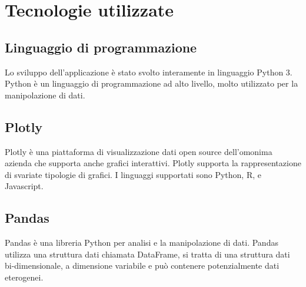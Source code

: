 
\section{Tecnologie utilizzate}

\subsection{Linguaggio di programmazione}
Lo sviluppo dell’applicazione è stato svolto interamente in linguaggio Python 3.
Python è un linguaggio di programmazione ad alto livello, molto utilizzato per la manipolazione di dati.

\subsection{Plotly}
Plotly è una piattaforma di visualizzazione dati open source dell’omonima azienda che supporta anche grafici interattivi.
Plotly supporta la rappresentazione di svariate tipologie di grafici.
I linguaggi supportati sono Python, R, e Javascript. 

\subsection{Pandas}
Pandas è una libreria Python per analisi e la manipolazione di dati.
Pandas utilizza una struttura dati chiamata DataFrame, si tratta di una struttura dati bi-dimensionale, a dimensione variabile e può contenere potenzialmente dati eterogenei.

